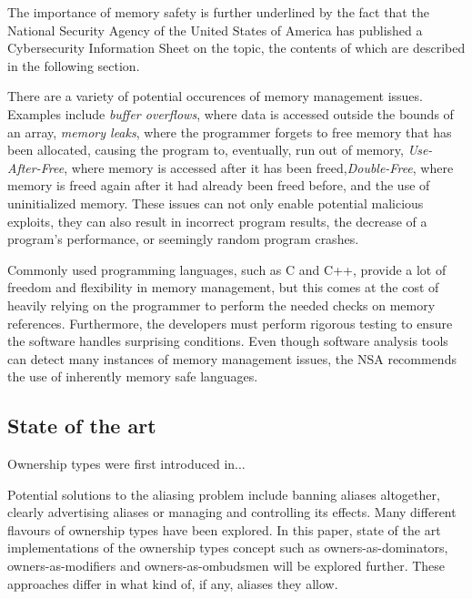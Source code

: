 \documentclass[sigplan,11pt,nonacm]{acmart}
\begin{document}
The importance of memory safety is further underlined by the fact that the National Security Agency of the United States of America has published a Cybersecurity Information Sheet \cite{nsa-memory-safety} on the topic, the contents of which are described in the following section.


There are a variety of potential occurences of memory management issues.
Examples include \emph{buffer overflows}, where data is accessed outside the bounds of an array, \emph{memory leaks}, where the programmer forgets to free memory that has been allocated, causing the program to, eventually, run out of memory, \emph{Use-After-Free}, where memory is accessed after it has been freed,\emph{Double-Free}, where memory is freed again after it had already been freed before, and the use of uninitialized memory.
These issues can not only enable potential malicious exploits, they can also result in incorrect program results, the decrease of a program's performance, or seemingly random program crashes.

Commonly used programming languages, such as C and C++, provide a lot of freedom and flexibility in memory management, but this comes at the cost of heavily relying on the programmer to perform the needed checks on memory references.
Furthermore, the developers must perform rigorous testing to ensure the software handles surprising conditions.
Even though software analysis tools can detect many instances of memory management issues, the NSA recommends the use of inherently memory safe languages.


\subsection{State of the art}


Ownership types were first introduced in...

Potential solutions to the aliasing problem include banning aliases altogether, clearly advertising aliases or managing and controlling its effects\cite{ownership-types-survey}.
Many different flavours of ownership types have been explored.
In this paper, state of the art implementations of the ownership types concept such as owners-as-dominators, owners-as-modifiers and owners-as-ombudsmen will be explored further.
These approaches differ in what kind of, if any, aliases they allow.
\cite{ownership-types-survey}
\end{document}

